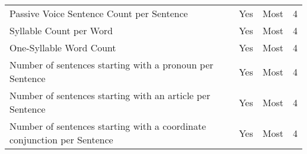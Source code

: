 \begin{table}[htbp]
\begin{tabular}{m{} c c c}
        Passive Voice Sentence Count per Sentence & Yes & Most & 4 \\
        Syllable Count per Word & Yes & Most & 4 \\
        One-Syllable Word Count & Yes & Most & 4 \\
        Number of sentences starting with a pronoun per Sentence & Yes & Most & 4 \\
        Number of sentences starting with an article per Sentence & Yes & Most & 4 \\
        Number of sentences starting with a coordinate conjunction per Sentence & Yes & Most & 4 \\
        \bottomrule
    \end{tabular}
\end{table}